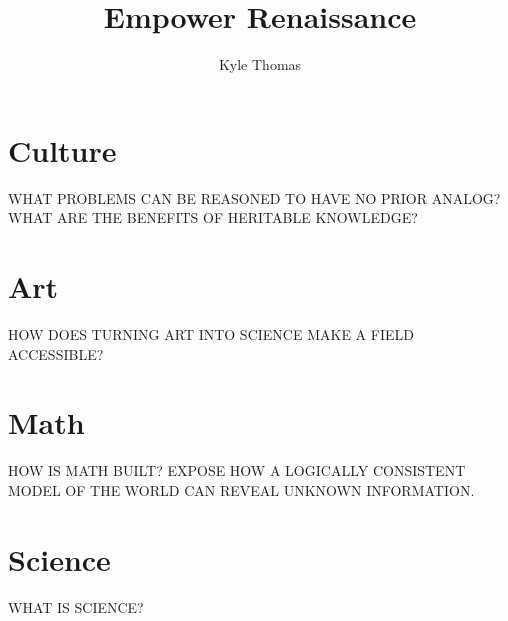 \documentclass[letter,twoside]{scrbook}
\begin{document}
\title{Empower Renaissance}
\author{Kyle Thomas}
\frontmatter
\maketitle
\tableofcontents
\mainmatter
\chapter{Culture}
WHAT PROBLEMS CAN BE REASONED TO HAVE NO PRIOR ANALOG?
WHAT ARE THE BENEFITS OF HERITABLE KNOWLEDGE?
\chapter{Art}
HOW DOES TURNING ART INTO SCIENCE MAKE A FIELD ACCESSIBLE?
\chapter{Math}
HOW IS MATH BUILT?
EXPOSE HOW A LOGICALLY CONSISTENT MODEL OF THE WORLD CAN REVEAL UNKNOWN INFORMATION.
\chapter{Science}
WHAT IS SCIENCE?
\end{document}
